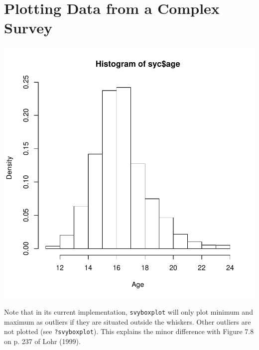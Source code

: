 \documentclass[article, 11pt, oneside]{memoir}
\begin{document}
\section{Plotting Data from a Complex Survey}

\begin{Schunk}
\end{Schunk}
\includegraphics{SDA_using_survey-013}


Note that in its current implementation, \texttt{svyboxplot} will
only plot minimum and maximum as outliers if they are situated 
outside the whiskers. Other outliers are not plotted 
(see \texttt{?svyboxplot}). This explains the minor difference with
Figure 7.8 on p. 237 of Lohr (1999).
\end{document}
